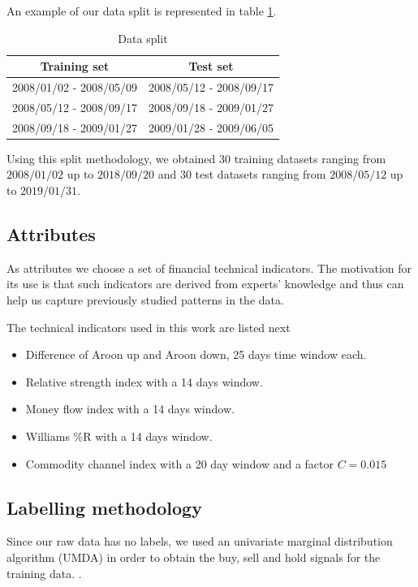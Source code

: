 \documentclass[preprint,3p,twocolumn]{elsarticle}
\begin{document}
An example of our data split is represented in table \ref{table:data split}.

\begin{table}[h]
\centering
\begin{tabular}{cc}
\hline
\textbf{Training set} & \textbf{Test set} \\
\hline
2008/01/02 - 2008/05/09 & 2008/05/12 - 2008/09/17 \\
2008/05/12 - 2008/09/17 & 2008/09/18 - 2009/01/27 \\
2008/09/18 - 2009/01/27 & 2009/01/28 - 2009/06/05 \\
\hline
\end{tabular}
\caption{\label{table:data split} Data split}
\end{table}

Using this split methodology, we obtained $30$ training datasets ranging from $2008/01/02$ up to $2018/09/20$ and $30$ test datasets ranging from $2008/05/12$ up to $2019/01/31$.

\subsection{Attributes}
\label{subsec:attributes}
As attributes we choose a set of financial technical indicators. The motivation for its use is that such indicators are derived from experts' knowledge and thus can help us capture previously studied patterns in the data.

The technical indicators used in this work are listed next

\begin{itemize}
\item Difference of Aroon up and Aroon down, 25 days time window each.

\item Relative strength index with a 14 days window.

\item Money flow index with a 14 days window.

\item Williams \%R with a 14 days window.

\item Commodity channel index with a 20 day window and a factor $C = 0.015$
\end{itemize}

\subsection{Labelling methodology}
\label{subsec:labelling}
Since our raw data has no labels, we used an univariate marginal distribution algorithm (UMDA) in order to obtain the buy, sell and hold signals for the training data. \cite{simon2013evolutionary}.
\end{document}
